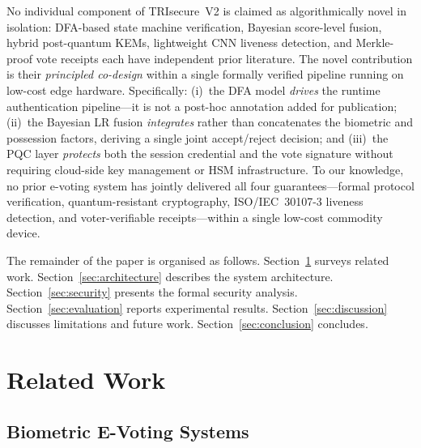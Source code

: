 \documentclass[preprint,12pt]{elsarticle}
\begin{document}
No individual component of TRIsecure~V2 is claimed as algorithmically novel
in isolation: DFA-based state machine verification, Bayesian score-level
fusion, hybrid post-quantum KEMs, lightweight CNN liveness detection, and
Merkle-proof vote receipts each have independent prior literature.
The novel contribution is their \emph{principled co-design} within a single
formally verified pipeline running on low-cost edge hardware.
Specifically: (i)~the DFA model \emph{drives} the runtime authentication
pipeline—it is not a post-hoc annotation added for publication; (ii)~the
Bayesian LR fusion \emph{integrates} rather than concatenates the biometric
and possession factors, deriving a single joint accept/reject decision; and
(iii)~the PQC layer \emph{protects} both the session credential and the
vote signature without requiring cloud-side key management or HSM
infrastructure.
To our knowledge, no prior e-voting system has jointly delivered all four
guarantees—formal protocol verification, quantum-resistant cryptography,
ISO/IEC~30107-3 liveness detection, and voter-verifiable receipts—within a
single low-cost commodity device.

The remainder of the paper is organised as follows.
Section~\ref{sec:related} surveys related work.
Section~\ref{sec:architecture} describes the system architecture.
Section~\ref{sec:security} presents the formal security analysis.
Section~\ref{sec:evaluation} reports experimental results.
Section~\ref{sec:discussion} discusses limitations and future work.
Section~\ref{sec:conclusion} concludes.

\section{Related Work}
\label{sec:related}

\subsection{Biometric E-Voting Systems}
\end{document}
